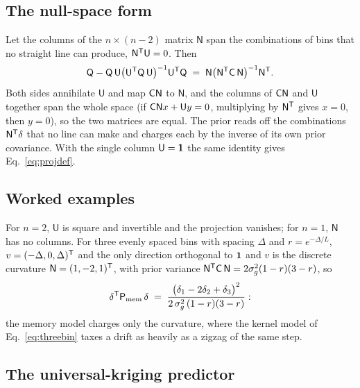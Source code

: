 \subsection{The null-space form}

Let the columns of the $n \times (n-2)$ matrix $\mathsf{N}$ span the
combinations of bins that no straight line can produce,
$\mathsf{N}^{\mathsf{T}} \mathsf{U} = 0$.  Then
\begin{equation}
  \mathsf{Q} - \mathsf{Q}\,\mathsf{U}
  \bigl(\mathsf{U}^{\mathsf{T}} \mathsf{Q}\,\mathsf{U}\bigr)^{-1}
  \mathsf{U}^{\mathsf{T}} \mathsf{Q}
  \;=\;
  \mathsf{N}
  \bigl(\mathsf{N}^{\mathsf{T}} \mathsf{C}\, \mathsf{N}\bigr)^{-1}
  \mathsf{N}^{\mathsf{T}} .
  \label{eq:memnull}
\end{equation}
Both sides annihilate $\mathsf{U}$ and map $\mathsf{C}\mathsf{N}$ to
$\mathsf{N}$, and the columns of $\mathsf{C}\mathsf{N}$ and $\mathsf{U}$
together span the whole space (if $\mathsf{C}\mathsf{N}x + \mathsf{U}y = 0$,
multiplying by $\mathsf{N}^{\mathsf{T}}$ gives $x = 0$, then $y = 0$), so the two
matrices are equal.  The prior reads off the combinations
$\mathsf{N}^{\mathsf{T}}\delta$ that no line can make and charges each by the
inverse of its own prior covariance.  With the single column
$\mathsf{U} = \mathbf{1}$ the same identity gives Eq.~\eqref{eq:projdef}.

\subsection{Worked examples}

For $n = 2$, $\mathsf{U}$ is square and invertible and the projection
vanishes; for $n = 1$, $\mathsf{N}$ has no columns.  For three evenly
spaced bins with spacing $\Delta$ and $r = e^{-\Delta/L}$,
$v = (-\Delta, 0, \Delta)^{\mathsf{T}}$ and the only direction orthogonal to
$\mathbf{1}$ and $v$ is the discrete curvature $\mathsf{N} = (1, -2, 1)^{\mathsf{T}}$,
with prior variance $\mathsf{N}^{\mathsf{T}} \mathsf{C}\, \mathsf{N} =
2\sigma_g^2(1 - r)(3 - r)$, so
\begin{equation}
  \delta^{\mathsf{T}} \mathsf{P}_{\rm mem}\,\delta
  \;=\;
  \frac{\bigl(\delta_1 - 2\delta_2 + \delta_3\bigr)^2}
       {2\,\sigma_g^2\,(1 - r)(3 - r)} :
  \label{eq:memcurv}
\end{equation}
the memory model charges only the curvature, where the kernel model of
Eq.~\eqref{eq:threebin} taxes a drift as heavily as a zigzag of the
same step.

\subsection{The universal-kriging predictor}

